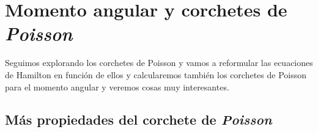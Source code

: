 \chapter{Momento angular y corchetes de \emph{Poisson}}




\vspace{10mm}
\begin{adjustwidth}{50pt}{50pt}
\begin{ejemplo}

Seguimos explorando los corchetes de Poisson y vamos a reformular las ecuaciones de Hamilton en función de ellos y calcularemos también los corchetes de Poisson para el momento angular y veremos cosas muy interesantes.

\end{ejemplo}
\end{adjustwidth}
\vspace{5mm}
\section{Más propiedades del corchete de \emph{Poisson}}
\label{T22CPmasP}

